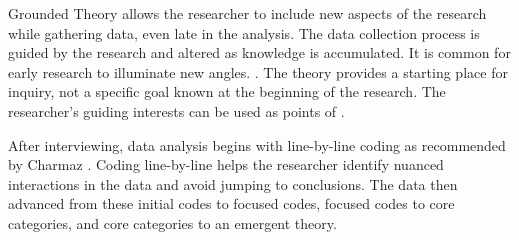 Grounded Theory allows the researcher to include new aspects of the research while gathering data, even late in the analysis. The data collection process is guided by the research and altered as knowledge is accumulated. It is common for early research to illuminate new angles.  \cite{Charmaz}. The theory provides a starting place for inquiry, not a specific goal known at the beginning of the research. The researcher's guiding interests can be used as points of   \cite{Charmaz}.

After interviewing, data analysis begins with line-by-line coding as recommended by Charmaz \cite{Charmaz}. Coding line-by-line helps the researcher identify nuanced interactions in the data and avoid jumping to conclusions. The data then advanced from these initial codes to focused codes, focused codes to core categories, and core categories to an emergent theory. 
